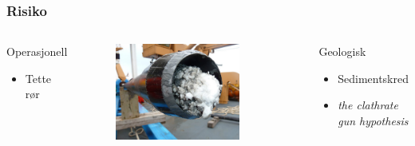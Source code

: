 \documentclass[utf8x, notes, graphics]{beamer}
\begin{document}
\begin{frame}
\frametitle{Risiko}
\begin{columns}[T]
\begin{block}{Operasjonell}
\begin{itemize}
\item Tette rør
\end{itemize}
\end{block}

\begin{figure}
\includegraphics[width=0.8\textwidth]{../pictures/pipe_plug.pdf}
\end{figure}

\begin{block}{Geologisk}
\begin{itemize}
\item Sedimentskred
\item \emph{the clathrate gun hypothesis}
\end{itemize}
\end{block}
\end{columns}
\end{frame}
\end{document}
